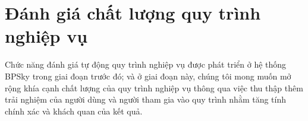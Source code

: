 \section{Đánh giá chất lượng quy trình nghiệp vụ}
Chức năng đánh giá tự động quy trình nghiệp vụ được phát triển ở hệ thống BPSky trong giai đoạn trước đó; và ở giai đoạn này,
chúng tôi mong muốn mở rộng khía cạnh chất lượng của quy trình nghiệp vụ thông qua việc thu thập thêm
trải nghiệm của người dùng và người tham gia vào quy trình nhằm tăng tính chính xác và khách quan của kết quả.





